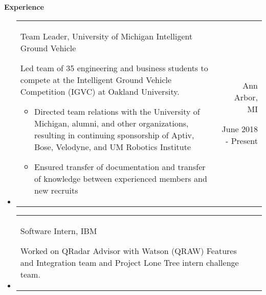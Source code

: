 \documentclass[9pt]{memoir}
\begin{document}
\begin{mdframed}
\textbf{Experience}
\end{mdframed}

\begin{itemize}

\item

\begin{tabular}[t]{lr}

\begin{minipage}[t]{0.7 \textwidth}
\raggedright

\normalsize
Team Leader, University of Michigan Intelligent Ground Vehicle

\small

Led team of 35 engineering and business students to compete at the Intelligent Ground Vehicle
Competition (IGVC) at Oakland University.

\begin{itemize}
\item Directed team relations with the University of Michigan, alumni, and other organizations,
      resulting in continuing sponsorship of Aptiv, Bose, Velodyne, and UM Robotics Institute
\item Ensured transfer of documentation and transfer of knowledge between experienced members and
      new recruits
\end{itemize}

\end{minipage}

&

\begin{minipage}[t]{0.2 \textwidth}
\raggedleft

\normalsize
Ann Arbor, MI

\small
June 2018 - Present
\end{minipage}

\\

\end{tabular}

\item

\begin{tabular}[t]{lr}

\begin{minipage}[t]{0.7 \textwidth}
\raggedright

\normalsize
Software Intern, IBM

\small

Worked on QRadar Advisor with Watson (QRAW) Features and Integration team and Project Lone
Tree intern challenge team.


\end{minipage}
\end{tabular}
\end{itemize}
\end{document}

